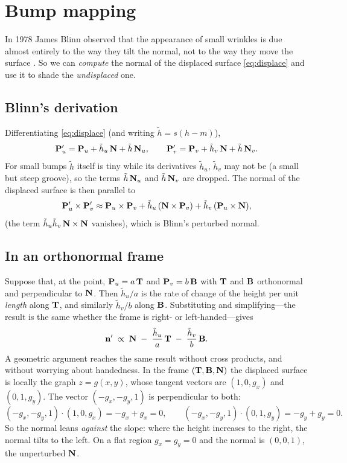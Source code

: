 \section{Bump mapping}
\label{sec:bump}

In 1978 James Blinn observed that the appearance of small wrinkles is due almost entirely to
the way they tilt the normal, not to the way they move the surface \cite{blinn1978}. So we can
\emph{compute} the normal of the displaced surface \eqref{eq:displace} and use it to shade the
\emph{undisplaced} one.

\subsection{Blinn's derivation}
Differentiating \eqref{eq:displace} (and writing $\tilde h = s(h-m)$),
\[
  \mathbf{P}'_u = \mathbf{P}_u + \tilde h_u\,\mathbf{N} + \tilde h\,\mathbf{N}_u,\qquad
  \mathbf{P}'_v = \mathbf{P}_v + \tilde h_v\,\mathbf{N} + \tilde h\,\mathbf{N}_v .
\]
For small bumps $\tilde h$ itself is tiny while its derivatives $\tilde h_u$, $\tilde h_v$ may
not be (a small but steep groove), so the terms $\tilde h\,\mathbf{N}_u$ and $\tilde h\,\mathbf{N}_v$ are
dropped. The normal of the displaced surface is then parallel to
\[
  \mathbf{P}'_u\times\mathbf{P}'_v \approx
  \mathbf{P}_u\times\mathbf{P}_v + \tilde h_u\,(\mathbf{N}\times\mathbf{P}_v) + \tilde h_v\,(\mathbf{P}_u\times\mathbf{N}),
\]
(the term $\tilde h_u\tilde h_v\,\mathbf{N}\times\mathbf{N}$ vanishes), which is Blinn's perturbed normal.

\subsection{In an orthonormal frame}
Suppose that, at the point, $\mathbf{P}_u = a\,\mathbf{T}$ and $\mathbf{P}_v = b\,\mathbf{B}$ with $\mathbf{T}$ and $\mathbf{B}$
orthonormal and perpendicular to $\mathbf{N}$. Then $\tilde h_u/a$ is the rate of change of the height
per unit \emph{length} along $\mathbf{T}$, and similarly $\tilde h_v/b$ along $\mathbf{B}$. Substituting
and simplifying---the result is the same whether the frame is right- or left-handed---gives
\begin{equation}
  \label{eq:bumpframe}
  \mathbf{n}' \;\propto\; \mathbf{N} \;-\; \frac{\tilde h_u}{a}\,\mathbf{T} \;-\; \frac{\tilde h_v}{b}\,\mathbf{B} .
\end{equation}
A geometric argument reaches the same result without cross products, and without worrying
about handedness. In the frame $(\mathbf{T},\mathbf{B},\mathbf{N})$ the displaced surface is locally the graph
$z = g(x,y)$, whose tangent vectors are $(1,0,g_x)$ and $(0,1,g_y)$. The vector
$(-g_x,-g_y,1)$ is perpendicular to both:
\[
  (-g_x,-g_y,1)\cdot(1,0,g_x) = -g_x + g_x = 0,\qquad
  (-g_x,-g_y,1)\cdot(0,1,g_y) = -g_y + g_y = 0 .
\]
So the normal leans \emph{against} the slope: where the height increases to the right, the
normal tilts to the left. On a flat region $g_x=g_y=0$ and the normal is $(0,0,1)$, the
unperturbed $\mathbf{N}$.

